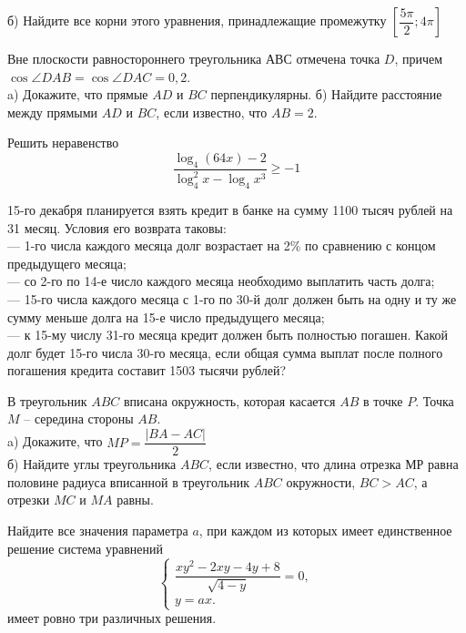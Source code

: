 \begin{listofex}
	б) Найдите все корни этого уравнения, принадлежащие
	промежутку \( \left[\dfrac{5\pi}{2};4\pi\right] \)
	\item Вне плоскости равностороннего треугольника \( АВС \)
	отмечена точка \( D \), причем \\ \( \cos\angle DAB = \cos\angle DAC = 0,2 \).\\
	a) Докажите, что прямые \( AD \) и \( BC \) перпендикулярны.
	б) Найдите расстояние между прямыми \( AD \) и \( BC \), если известно, что \( AB=2 \).
	\item Решить неравенство \[ \dfrac{\log_4(64x)-2}{\log^2_4 x-\log_4 x^3}\ge-1 \]
	\item 15-го декабря планируется взять кредит в банке на сумму
	1100 тысяч рублей на 31 месяц. Условия его возврата таковы:\\
	--- 1-го числа каждого месяца долг возрастает на 2\% по
	сравнению с концом предыдущего месяца;\\
	--- со 2-го по 14-е число каждого месяца необходимо
	выплатить часть долга;\\
	--- 15-го числа каждого месяца с 1-го по 30-й долг должен
	быть на одну и ту же сумму меньше долга на 15-е число
	предыдущего месяца;\\
	--- к 15-му числу 31-го месяца кредит должен быть
	полностью погашен. Какой долг будет 15-го числа 30-го месяца,
	если общая сумма выплат после полного погашения кредита
	составит 1503 тысячи рублей?
	\item В треугольник \( ABC \) вписана окружность, которая
	касается \( AB \) в точке \( P \). Точка \( M \) – середина стороны \( AB \).\\
	a) Докажите, что \( MP=\dfrac{|BA-AC|}{2} \)\\
	б) Найдите углы треугольника \( ABC \), если известно, что
	длина отрезка \( МР \) равна половине радиуса вписанной в
	треугольник \( ABC \) окружности, \( BC > AC \), а отрезки \( MC \) и \( MA \)
	равны.
	\item Найдите все значения параметра \( a \), при каждом из которых имеет единственное решение система уравнений
	\[ \left\{
	\begin{array}{l}
		\dfrac{xy^2-2xy-4y+8}{\sqrt{4-y}}=0,\\
		y=ax.
	\end{array}
	\right. \]
	имеет ровно три различных решения.
\end{listofex}